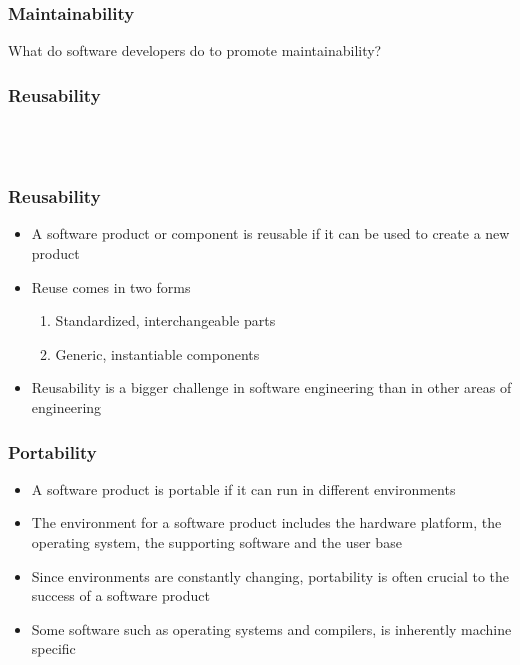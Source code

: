 \documentclass[t,12pt,numbers,fleqn]{beamer}
\begin{document}

\begin{frame}
\frametitle{Maintainability}

What do software developers do to promote maintainability?


\end{frame}


\begin{frame}
\frametitle{Reusability}

\\
~\\

\end{frame}


\begin{frame}
\frametitle{Reusability}

\begin{itemize}
\item A software product or component is reusable if it can be used to create a
  new product
\item Reuse comes in two forms
\begin{enumerate}
\item Standardized, interchangeable parts
\item Generic, instantiable components
\end{enumerate}
\item Reusability is a bigger challenge in software engineering than in other
  areas of engineering
\end{itemize}

\end{frame}


\begin{frame}
\frametitle{Portability}

\begin{itemize}
\item A software product is portable if it can run in different environments
\item The environment for a software product includes the hardware platform, the
  operating system, the supporting software and the user base
\item Since environments are constantly changing, portability is often crucial
  to the success of a software product
\item Some software such as operating systems and compilers, is inherently
  machine specific
\end{itemize}

\end{frame}
\end{document}
